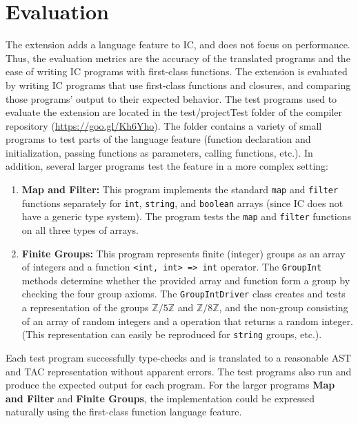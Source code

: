 \documentclass{article}
\newcommand{\Z}{\mathbb{Z}}
\begin{document}
\section{Evaluation}
\label{evaluation}
The extension adds a language feature to IC, and does not focus on performance. Thus, the evaluation metrics are the accuracy of the translated programs and the ease of writing IC programs with first-class functions. The extension is evaluated by writing IC programs that use first-class functions and closures, and comparing those programs' output to their expected behavior. The test programs used to evaluate the extension are located in the test/projectTest folder of the compiler repository (\url{https://goo.gl/Kh6Yho}). The folder contains a variety of small programs to test parts of the language feature (function declaration and initialization, passing functions as parameters, calling functions, etc.). In addition, several larger programs test the feature in a more complex setting:
\begin{enumerate}
    \item \textbf{Map and Filter:} This program implements the standard \texttt{map} and \texttt{filter} functions separately for \texttt{int}, \texttt{string}, and \texttt{boolean} arrays (since IC does not have a generic type system). The program tests the \texttt{map} and \texttt{filter} functions on all three types of arrays.
    \item \textbf{Finite Groups:} This program represents finite (integer) groups as an array of integers and a function \texttt{<int, int> => int} operator. The \texttt{GroupInt} methods determine whether the provided array and function form a group by checking the four group axioms. The \texttt{GroupIntDriver} class creates and tests a representation of the groups $\Z/5\Z$ and $\Z/8\Z$, and the non-group consisting of an array of random integers and a operation that returns a random integer. (This representation can easily be reproduced for \texttt{string} groups, etc.).
\end{enumerate}
Each test program successfully type-checks and is translated to a reasonable AST and TAC representation without apparent errors. The test programs also run and produce the expected output for each program. For the larger programs \textbf{Map and Filter} and \textbf{Finite Groups}, the implementation could be expressed naturally using the first-class function language feature.
\end{document}
